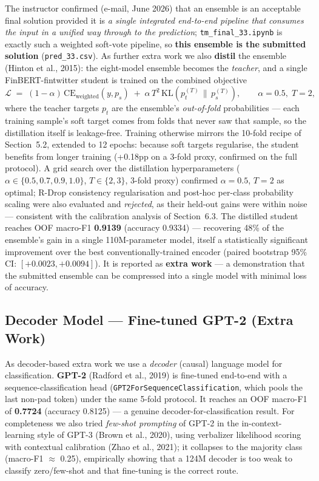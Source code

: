 \documentclass[11pt,a4paper]{article}
\newcommand{\distf}{0.9139}    %
\newcommand{\distacc}{0.9334}  %
\begin{document}
The instructor confirmed (e-mail, June 2026) that an ensemble is an acceptable final solution
provided it is \emph{a single integrated end-to-end pipeline that consumes the input in a unified
way through to the prediction}; \nolinkurl{tm_final_33.ipynb} is exactly such a weighted soft-vote
pipeline, so \textbf{this ensemble is the submitted solution} (\nolinkurl{pred_33.csv}). As
further extra work we also \textbf{distil} the ensemble (Hinton et al., 2015): the eight-model
ensemble becomes the
\emph{teacher}, and a single FinBERT-fintwitter student is trained on the combined objective
\[
\mathcal{L} \;=\; (1-\alpha)\,\mathrm{CE}_{\text{weighted}}(y, p_s)
\;+\; \alpha\, T^2\, \mathrm{KL}\!\left(p_t^{(T)} \,\|\, p_s^{(T)}\right),
\qquad \alpha = 0.5,\; T = 2,
\]
where the teacher targets $p_t$ are the ensemble's \emph{out-of-fold} probabilities --- each
training sample's soft target comes from folds that never saw that sample, so the distillation
itself is leakage-free. Training otherwise mirrors the 10-fold recipe of Section~5.2, extended to
12 epochs: because soft targets regularise, the student benefits from longer training (+0.18pp on
a 3-fold proxy, confirmed on the full protocol). A grid search
over the distillation hyperparameters ($\alpha \in \{0.5, 0.7, 0.9, 1.0\}$, $T \in \{2, 3\}$,
3-fold proxy) confirmed $\alpha{=}0.5$, $T{=}2$ as optimal; R-Drop consistency regularisation and
post-hoc per-class probability scaling were also evaluated and \emph{rejected}, as their held-out
gains were within noise --- consistent
with the calibration analysis of Section~6.3. The distilled
student reaches OOF macro-F1 \textbf{\distf} (accuracy \distacc) --- recovering 48\% of the
ensemble's gain in a single 110M-parameter model, itself a statistically significant improvement
over the best conventionally-trained encoder (paired bootstrap 95\% CI: $[+0.0023, +0.0094]$).
It is reported as \textbf{extra work} --- a demonstration that the submitted ensemble can be
compressed into a single model with minimal loss of accuracy.

\subsection{Decoder Model --- Fine-tuned GPT-2 (Extra Work)}
As decoder-based extra work we use a \emph{decoder} (causal) language model for classification.
\textbf{GPT-2} (Radford et al., 2019) is fine-tuned end-to-end with a sequence-classification head
(\texttt{GPT2ForSequenceClassification}, which pools the last non-pad token) under the same 5-fold
protocol. It reaches an OOF macro-F1 of \textbf{0.7724} (accuracy 0.8125) --- a genuine
decoder-for-classification result. For completeness we also tried \emph{few-shot prompting} of GPT-2
in the in-context-learning style of GPT-3 (Brown et al., 2020), using verbalizer likelihood scoring
with contextual calibration (Zhao et al., 2021); it collapses to the majority class (macro-F1
$\approx$ 0.25), empirically showing that a 124M decoder is too weak to classify zero/few-shot and
that fine-tuning is the correct route.
\end{document}
